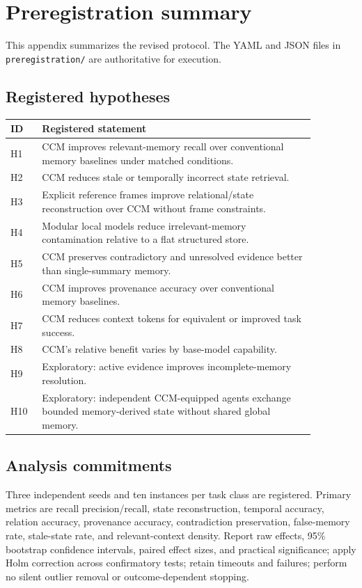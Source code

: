 \section{Preregistration summary}

This appendix summarizes the revised protocol. The YAML and JSON files in \texttt{preregistration/} are authoritative for execution.

\subsection{Registered hypotheses}

\scriptsize
\begin{longtable}{p{0.09\linewidth}p{0.78\linewidth}}
\toprule
ID & Registered statement \\
\midrule
H1 & CCM improves relevant-memory recall over conventional memory baselines under matched conditions. \\
H2 & CCM reduces stale or temporally incorrect state retrieval. \\
H3 & Explicit reference frames improve relational/state reconstruction over CCM without frame constraints. \\
H4 & Modular local models reduce irrelevant-memory contamination relative to a flat structured store. \\
H5 & CCM preserves contradictory and unresolved evidence better than single-summary memory. \\
H6 & CCM improves provenance accuracy over conventional memory baselines. \\
H7 & CCM reduces context tokens for equivalent or improved task success. \\
H8 & CCM's relative benefit varies by base-model capability. \\
H9 & Exploratory: active evidence improves incomplete-memory resolution. \\
H10 & Exploratory: independent CCM-equipped agents exchange bounded memory-derived state without shared global memory. \\
\bottomrule
\end{longtable}
\normalsize

\subsection{Analysis commitments}

Three independent seeds and ten instances per task class are registered. Primary metrics are recall precision/recall, state reconstruction, temporal accuracy, relation accuracy, provenance accuracy, contradiction preservation, false-memory rate, stale-state rate, and relevant-context density. Report raw effects, 95\% bootstrap confidence intervals, paired effect sizes, and practical significance; apply Holm correction across confirmatory tests; retain timeouts and failures; perform no silent outlier removal or outcome-dependent stopping.

